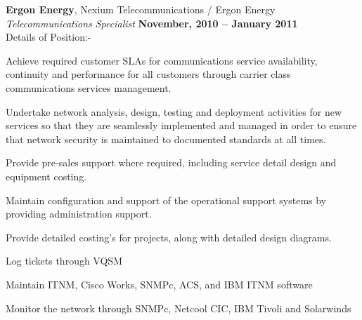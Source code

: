 \documentclass[margin,line]{resume}
\begin{document}
\begin{resume}
    {\bf Ergon Energy}, Nexium Telecommunications / Ergon Energy  \vspace{2mm}\\\vspace{1mm}%
        {\sl Telecommunications Specialist} \hfill {\bf November, 2010 -- January 2011}\\
             Details of Position:-
                  \begin{list2}
                          \vspace*{1mm}
                          \item Achieve required customer SLAs for communications service availability, continuity and performance for all customers through carrier class communications services management.
                          \item Undertake network analysis, design, testing and deployment activities for new services so that they are seamlessly 
implemented and managed in order to ensure that network security is maintained to documented standards at all times.
                          \item Provide pre-sales support where required, including service detail design and equipment costing.
                          \item Maintain configuration and support of the operational support systems by providing administration support.
                          \item Provide detailed costing's for projects, along with detailed design diagrams.
			  \item Log tickets through VQSM
			  \item Maintain ITNM, Cisco Works, SNMPc, ACS, and IBM ITNM software
			  \item Monitor the network through SNMPc, Netcool CIC, IBM Tivoli and Solarwinds
                          \end{list2}


\end{resume}
\end{document}
